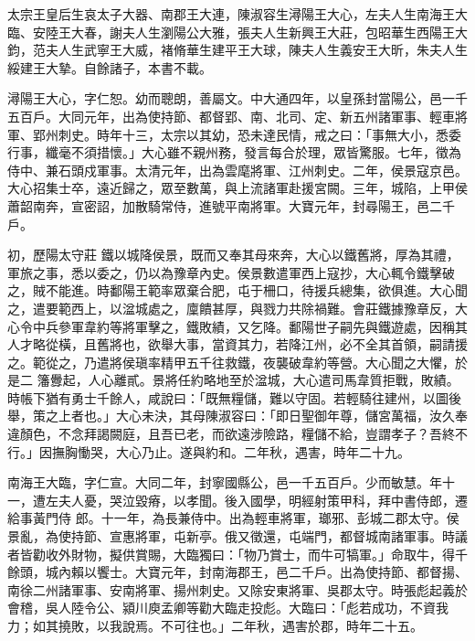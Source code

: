 
\begin{pinyinscope}

 太宗王皇后生哀太子大器、南郡王大連，陳淑容生潯陽王大心，左夫人生南海王大臨、安陸王大春，謝夫人生瀏陽公大雅，張夫人生新興王大莊，包昭華生西陽王大鈞，范夫人生武寧王大威，褚脩華生建平王大球，陳夫人生義安王大昕，朱夫人生綏建王大摯。自餘諸子，本書不載。



 潯陽王大心，字仁恕。幼而聰朗，善屬文。中大通四年，以皇孫封當陽公，邑一千五百戶。大同元年，出為使持節、都督郢、南、北司、定、新五州諸軍事、輕車將軍、郢州刺史。時年十三，太宗以其幼，恐未達民情，戒之曰：「事無大小，悉委行事，纖毫不須措懷。」大心雖不親州務，發言每合於理，眾皆驚服。七年，徵為侍中、兼石頭戍軍事。太清元年，出為雲麾將軍、江州刺史。二年，侯景寇京邑。大心招集士卒，遠近歸之，眾至數萬，與上流諸軍赴援宮闕。三年，城陷，上甲侯蕭韶南奔，宣密詔，加散騎常侍，進號平南將軍。大寶元年，封尋陽王，邑二千戶。



 初，歷陽太守莊
 鐵以城降侯景，既而又奉其母來奔，大心以鐵舊將，厚為其禮，軍旅之事，悉以委之，仍以為豫章內史。侯景數遣軍西上寇抄，大心輒令鐵擊破之，賊不能進。時鄱陽王範率眾棄合肥，屯于柵口，待援兵總集，欲俱進。大心聞之，遣要範西上，以湓城處之，廩饋甚厚，與戮力共除禍難。會莊鐵據豫章反，大心令中兵參軍韋約等將軍擊之，鐵敗績，又乞降。鄱陽世子嗣先與鐵遊處，因稱其人才略從橫，且舊將也，欲舉大事，當資其力，若降江州，必不全其首領，嗣請援之。範從之，乃遣將侯瑱率精甲五千往救鐵，夜襲破韋約等營。大心聞之大懼，於是二
 籓釁起，人心離貳。景將任約略地至於湓城，大心遣司馬韋質拒戰，敗績。時帳下猶有勇士千餘人，咸說曰：「既無糧儲，難以守固。若輕騎往建州，以圖後舉，策之上者也。」大心未決，其母陳淑容曰：「即日聖御年尊，儲宮萬福，汝久奉違顏色，不念拜謁闕庭，且吾已老，而欲遠涉險路，糧儲不給，豈謂孝子？吾終不行。」因撫胸慟哭，大心乃止。遂與約和。二年秋，遇害，時年二十九。



 南海王大臨，字仁宣。大同二年，封寧國縣公，邑一千五百戶。少而敏慧。年十一，遭左夫人憂，哭泣毀瘠，以孝聞。後入國學，明經射策甲科，拜中書侍郎，遷給事黃門侍
 郎。十一年，為長兼侍中。出為輕車將軍，瑯邪、彭城二郡太守。侯景亂，為使持節、宣惠將軍，屯新亭。俄又徵還，屯端門，都督城南諸軍事。時議者皆勸收外財物，擬供賞賜，大臨獨曰：「物乃賞士，而牛可犒軍。」命取牛，得千餘頭，城內賴以饗士。大寶元年，封南海郡王，邑二千戶。出為使持節、都督揚、南徐二州諸軍事、安南將軍、揚州刺史。又除安東將軍、吳郡太守。時張彪起義於會稽，吳人陸令公、潁川庾孟卿等勸大臨走投彪。大臨曰：「彪若成功，不資我力；如其撓敗，以我說焉。不可往也。」二年秋，遇害於郡，時年二十五。




\end{pinyinscope}

